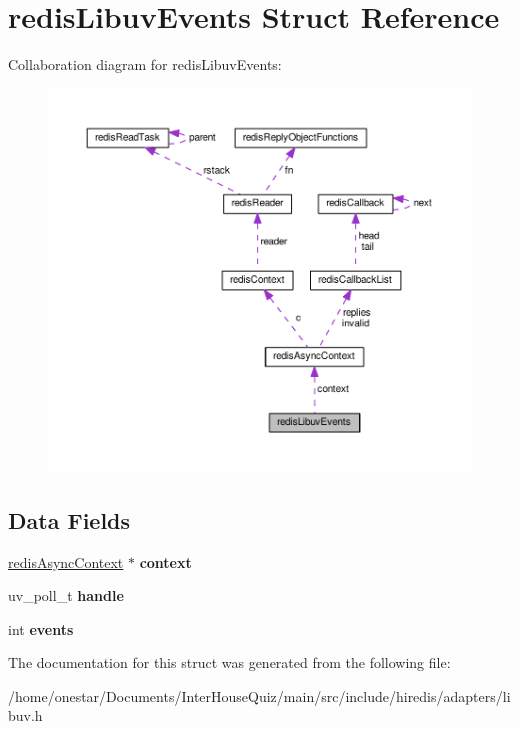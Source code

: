 \hypertarget{structredis_libuv_events}{\section{redis\+Libuv\+Events Struct Reference}
\label{structredis_libuv_events}
}


Collaboration diagram for redis\+Libuv\+Events\+:\nopagebreak
\begin{figure}[H]
\begin{center}
\leavevmode
\includegraphics[width=350pt]{structredis_libuv_events__coll__graph}
\end{center}
\end{figure}
\subsection*{Data Fields}
\begin{DoxyCompactItemize}
\item 
\hypertarget{structredis_libuv_events_a5764ffeda6751a7e3eec0eb29d402bde}{\hyperlink{structredis_async_context}{redis\+Async\+Context} $\ast$ {\bfseries context}}\label{structredis_libuv_events_a5764ffeda6751a7e3eec0eb29d402bde}

\item 
\hypertarget{structredis_libuv_events_a849f87dedc1ec17351487d2e0eeb8044}{uv\+\_\+poll\+\_\+t {\bfseries handle}}\label{structredis_libuv_events_a849f87dedc1ec17351487d2e0eeb8044}

\item 
\hypertarget{structredis_libuv_events_a81a8a3a775bf2b769ce2a0f687a44c9f}{int {\bfseries events}}\label{structredis_libuv_events_a81a8a3a775bf2b769ce2a0f687a44c9f}

\end{DoxyCompactItemize}


The documentation for this struct was generated from the following file\+:\begin{DoxyCompactItemize}
\item 
/home/onestar/\+Documents/\+Inter\+House\+Quiz/main/src/include/hiredis/adapters/libuv.\+h\end{DoxyCompactItemize}
